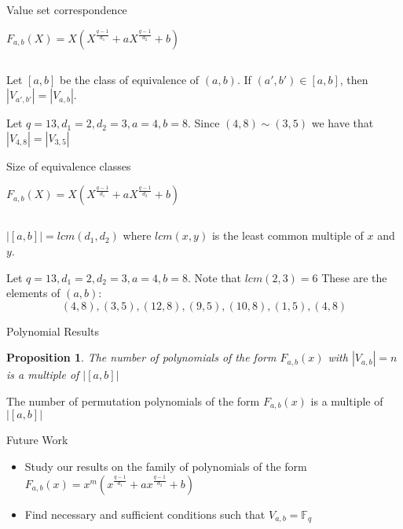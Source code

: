 \documentclass{beamer}
\newtheorem{proposition}{Proposition}
\begin{document}
\begin{frame}{Value set correspondence}

  {\Large $F_{a,b}(X) = X(X^{\frac{q-1}{d_1}} + aX^{\frac{q-1}{d_2}} +b)$}

  $$$$

  \begin{lemma}

    Let $[a, b]$ be the class of equivalence of $(a, b)$. If $(a', b') \in [a, b]$,
     then $|V_{a', b'}| = |V_{a, b}|$.

  \end{lemma}

  \begin{example}
    Let $q = 13, d_1 = 2, d_2 = 3, a = 4, b = 8$. Since $(4,8) \sim (3,5)$ we have that $|V_{4, 8}| = |V_{3, 5}|$
  \end{example}

\end{frame}

\begin{frame}{Size of equivalence classes}
  
  {\Large $F_{a,b}(X) = X(X^{\frac{q-1}{d_1}} + aX^{\frac{q-1}{d_2}} +b)$}

  $$$$

  \begin{lemma}
    $|[a, b]| = lcm(d_1,d_2)$ where $lcm(x,y)$ is the least common multiple of $x$ and $y$.
  \end{lemma}

  \begin{example}
    Let $q = 13, d_1 = 2, d_2 = 3, a = 4, b = 8$. Note that $lcm(2,3) = 6$ These are the elements of $(a,b)$:
    $$ (4, 8), (3, 5), (12, 8), (9, 5), (10, 8), (1, 5), (4,8) $$
  \end{example}
\end{frame}

\begin{frame}{Polynomial Results}
    \begin{proposition}
    The number of polynomials of the form $F_{a, b}(x)$ with $|V_{a, b}| = n$ is a multiple of $|[a, b]|$
  \end{proposition}

  \begin{corollary}
    The number of permutation polynomials of the form $F_{a, b}(x)$ is a multiple of $|[a, b]|$
  \end{corollary}
\end{frame}


\begin{frame}{Future Work}
  \begin{itemize}
    \item Study our results on the family of polynomials of the form $F_{a,b}(x) = x^m(x^{\frac{q-1}{d_1}} + ax^{\frac{q-1}{d_2}} +b)$
    \item Find necessary and sufficient conditions such that $V_{a,b} = \mathbb{F}_q$
  \end{itemize}
\end{frame}

\end{document}
